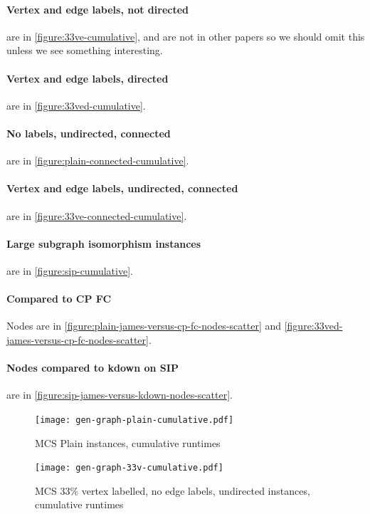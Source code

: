\documentclass[letterpaper]{article}
\begin{document}
\paragraph{Vertex and edge labels, not directed} are in \cref{figure:33ve-cumulative}, and are not in other papers so we should omit this unless we see something interesting.

\paragraph{Vertex and edge labels, directed} are in \cref{figure:33ved-cumulative}.

\paragraph{No labels, undirected, connected} are in \cref{figure:plain-connected-cumulative}.

\paragraph{Vertex and edge labels, undirected, connected} are in \cref{figure:33ve-connected-cumulative}.

\paragraph{Large subgraph isomorphism instances} are in \cref{figure:sip-cumulative}.

\paragraph{Compared to CP FC} Nodes are in \cref{figure:plain-james-versus-cp-fc-nodes-scatter} and \cref{figure:33ved-james-versus-cp-fc-nodes-scatter}.

\paragraph{Nodes compared to kdown on SIP} are in \cref{figure:sip-james-versus-kdown-nodes-scatter}.

\begin{figure}
    \centering
    \texttt{[image: gen-graph-plain-cumulative.pdf]}
    \caption{MCS Plain instances, cumulative runtimes}\label{figure:plain-cumulative}
\end{figure}

\begin{figure}
    \centering
    \texttt{[image: gen-graph-33v-cumulative.pdf]}
    \caption{MCS 33\% vertex labelled, no edge labels, undirected instances, cumulative runtimes}\label{figure:33v-cumulative}
\end{figure}
\end{document}
